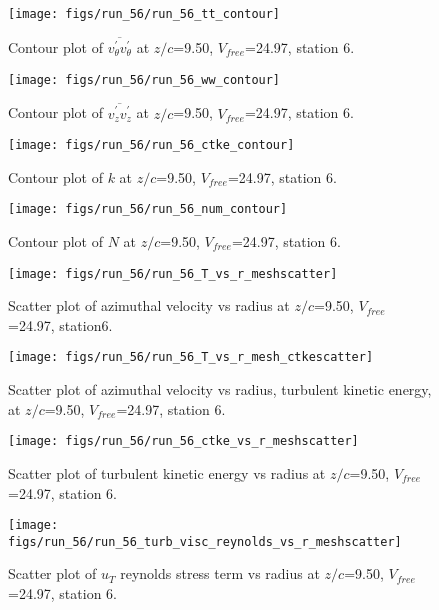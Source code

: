 \begin{figure}[H]
\centering
\texttt{[image: figs/run\_56/run\_56\_tt\_contour]}
\caption{Contour plot of $\overline{v_{\theta}^{\prime} v_{\theta}^{\prime}}$ at $z/c$=9.50, $V_{free}$=24.97, station 6.}
\end{figure}


\begin{figure}[H]
\centering
\texttt{[image: figs/run\_56/run\_56\_ww\_contour]}
\caption{Contour plot of $\overline{v_{z}^{\prime} v_{z}^{\prime}}$ at $z/c$=9.50, $V_{free}$=24.97, station 6.}
\end{figure}


\begin{figure}[H]
\centering
\texttt{[image: figs/run\_56/run\_56\_ctke\_contour]}
\caption{Contour plot of $k$ at $z/c$=9.50, $V_{free}$=24.97, station 6.}
\end{figure}


\begin{figure}[H]
\centering
\texttt{[image: figs/run\_56/run\_56\_num\_contour]}
\caption{Contour plot of $N$ at $z/c$=9.50, $V_{free}$=24.97, station 6.}
\end{figure}


\begin{figure}[H]
\centering
\texttt{[image: figs/run\_56/run\_56\_T\_vs\_r\_meshscatter]}
\caption{Scatter plot of azimuthal velocity vs radius at $z/c$=9.50, $V_{free}$=24.97, station6.}
\end{figure}


\begin{figure}[H]
\centering
\texttt{[image: figs/run\_56/run\_56\_T\_vs\_r\_mesh\_ctkescatter]}
\caption{Scatter plot of azimuthal velocity vs radius, turbulent kinetic energy, at $z/c$=9.50, $V_{free}$=24.97, station 6.}
\end{figure}


\begin{figure}[H]
\centering
\texttt{[image: figs/run\_56/run\_56\_ctke\_vs\_r\_meshscatter]}
\caption{Scatter plot of turbulent kinetic energy vs radius at $z/c$=9.50, $V_{free}$=24.97, station 6.}
\end{figure}


\begin{figure}[H]
\centering
\texttt{[image: figs/run\_56/run\_56\_turb\_visc\_reynolds\_vs\_r\_meshscatter]}
\caption{Scatter plot of $
u_T$ reynolds stress term vs radius at $z/c$=9.50, $V_{free}$=24.97, station 6.}
\end{figure}


